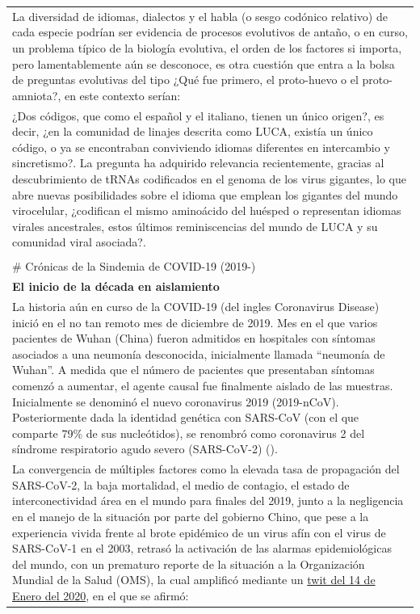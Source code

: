 \documentclass[
  12pt, krantz2,
  spanish,
]{krantz}
\begin{document}
\begin{longtable}[]{@{}
  >{\raggedright\arraybackslash}p{}@{}}
La diversidad de idiomas, dialectos y el habla (o sesgo codónico relativo) de cada especie podrían ser evidencia de procesos evolutivos de antaño, o en curso, un problema típico de la biología evolutiva, el orden de los factores si importa, pero lamentablemente aún se desconoce, es otra cuestión que entra a la bolsa de preguntas evolutivas del tipo ¿Qué fue primero, el proto-huevo o el proto-amniota?, en este contexto serían: \\
¿Dos códigos, que como el español y el italiano, tienen un único origen?, es decir, ¿en la comunidad de linajes descrita como LUCA, existía un único código, o ya se encontraban conviviendo idiomas diferentes en intercambio y sincretismo?.
La pregunta ha adquirido relevancia recientemente, gracias al descubrimiento de tRNAs codificados en el genoma de los virus gigantes, lo que abre nuevas posibilidades sobre el idioma que emplean los gigantes del mundo virocelular, ¿codifican el mismo aminoácido del huésped o representan idiomas virales ancestrales, estos últimos reminiscencias del mundo de LUCA y su comunidad viral asociada?. \\
 \\
\# Crónicas de la Sindemia de COVID-19 (2019-) \\
\textbf{El inicio de la década en aislamiento} \\
La historia aún en curso de la COVID-19 (del ingles Coronavirus Disease) inició en el no tan remoto mes de diciembre de 2019. Mes en el que varios pacientes de Wuhan (China) fueron admitidos en hospitales con síntomas asociados a una neumonía desconocida, inicialmente llamada ``neumonía de Wuhan''. A medida que el número de pacientes que presentaban síntomas comenzó a aumentar, el agente causal fue finalmente aislado de las muestras. Inicialmente se denominó el nuevo coronavirus 2019 (2019-nCoV). Posteriormente dada la identidad genética con SARS-CoV (con el que comparte 79\% de sus nucleótidos), se renombró como coronavirus 2 del síndrome respiratorio agudo severo (SARS-CoV-2) (\citet{andersen2020proximal}). \\
La convergencia de múltiples factores como la elevada tasa de propagación del SARS-CoV-2, la baja mortalidad, el medio de contagio, el estado de interconectividad área en el mundo para finales del 2019, junto a la negligencia en el manejo de la situación por parte del gobierno Chino, que pese a la experiencia vivida frente al brote epidémico de un virus afín con el virus de SARS-CoV-1 en el 2003, retrasó la activación de las alarmas epidemiológicas del mundo, con un prematuro reporte de la situación a la Organización Mundial de la Salud (OMS), la cual amplificó mediante un \href{https://twitter.com/WHO/status/1217043229427761152}{twit del 14 de Enero del 2020}, en el que se afirmó: \\

\end{longtable}
\end{document}
